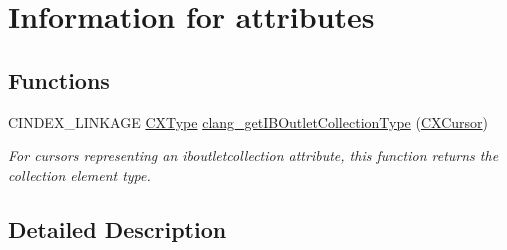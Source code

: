 \hypertarget{group__CINDEX__ATTRIBUTES}{}\section{Information for attributes}
\label{group__CINDEX__ATTRIBUTES}
\subsection*{Functions}
\begin{DoxyCompactItemize}
\item 
\mbox{\label{group__CINDEX__ATTRIBUTES_ga93c2c27353ae1a5d56303d09ec8ca1c2}} 
C\+I\+N\+D\+E\+X\+\_\+\+L\+I\+N\+K\+A\+GE \mbox{\hyperlink{structCXType}{C\+X\+Type}} \mbox{\hyperlink{group__CINDEX__ATTRIBUTES_ga93c2c27353ae1a5d56303d09ec8ca1c2}{clang\+\_\+get\+I\+B\+Outlet\+Collection\+Type}} (\mbox{\hyperlink{structCXCursor}{C\+X\+Cursor}})
\begin{DoxyCompactList}\small\item\em For cursors representing an iboutletcollection attribute, this function returns the collection element type. \end{DoxyCompactList}\end{DoxyCompactItemize}


\subsection{Detailed Description}

